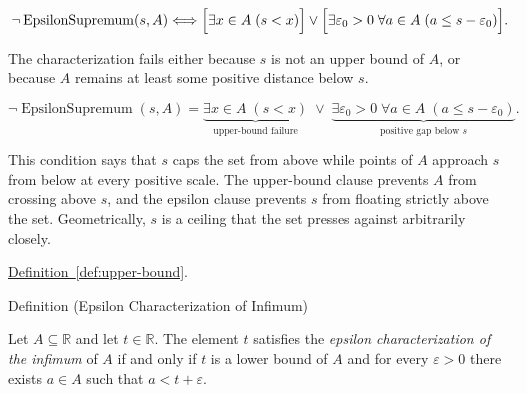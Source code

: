 \begin{remark*}
\[
\neg\operatorname{EpsilonSupremum}(s,A)\Longleftrightarrow
\Bigl[\exists x\in A\;(s<x)\Bigr]
\lor
\Bigl[\exists \varepsilon_0>0\;\forall a\in A\;(a\le s-\varepsilon_0)\Bigr].
\]
\end{remark*}

\begin{remark*}
The characterization fails either because $s$ is not an upper bound of $A$, or because $A$ remains at least some positive distance below $s$.
\end{remark*}

\begin{remark*}
\[
\neg\operatorname{EpsilonSupremum}(s,A)
=
\underbrace{\exists x\in A\;(s<x)}_{\text{upper-bound failure}}
\;\lor\;
\underbrace{\exists \varepsilon_0>0\;\forall a\in A\;(a\le s-\varepsilon_0)}_{\text{positive gap below }s}.
\]
\end{remark*}

\begin{remark*}[Interpretation]
This condition says that $s$ caps the set from above while points of $A$ approach $s$ from below at every positive scale. The upper-bound clause prevents $A$ from crossing above $s$, and the epsilon clause prevents $s$ from floating strictly above the set. Geometrically, $s$ is a ceiling that the set presses against arbitrarily closely.
\end{remark*}

\begin{dependencies}
\hyperref[def:upper-bound]{Definition~\ref*{def:upper-bound}}.
\end{dependencies}






















\begin{definitionbox}{Definition (Epsilon Characterization of Infimum)}
\begin{definition}
\label{def:epsilon-characterization-of-infimum}
Let $A\subseteq\mathbb{R}$ and let $t\in\mathbb{R}$. The element $t$ satisfies the \emph{epsilon characterization of the infimum} of $A$ if and only if $t$ is a lower bound of $A$ and for every $\varepsilon>0$ there exists $a\in A$ such that $a<t+\varepsilon$.
\end{definition}
\end{definitionbox}

